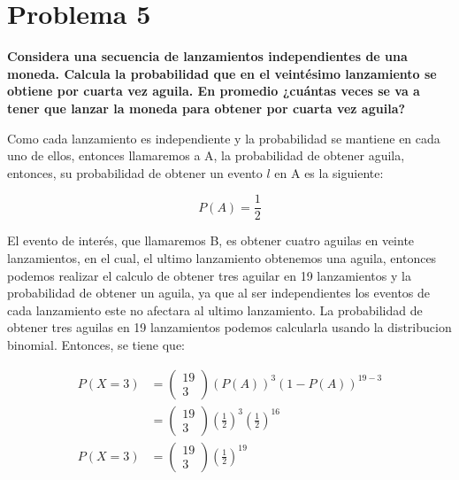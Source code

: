 \section*{Problema 5}
\textbf{Considera una secuencia de lanzamientos independientes de una moneda. Calcula la probabilidad que en el veintésimo lanzamiento se obtiene por cuarta vez aguila. En promedio ¿cuántas veces se va a tener que lanzar la moneda para obtener por cuarta vez aguila?}

Como cada lanzamiento es independiente y la probabilidad se mantiene en cada uno de ellos, entonces llamaremos a A, la probabilidad de obtener aguila, entonces, su probabilidad de obtener un evento $l$ en A es la siguiente:

\begin{equation*}
    P(A) = \frac{1}{2}
\end{equation*}

El evento de interés, que llamaremos B, es obtener cuatro aguilas en veinte lanzamientos, en el cual, el ultimo lanzamiento obtenemos una aguila, entonces podemos realizar el calculo de obtener tres aguilar en 19 lanzamientos y la probabilidad de obtener un aguila, ya que al ser independientes los eventos de cada lanzamiento este no afectara al ultimo lanzamiento. La probabilidad de obtener tres aguilas en 19 lanzamientos podemos calcularla usando la distribucion binomial. Entonces, se tiene que:

\begin{align*}
    P(X=3) & = \left(\begin{matrix}
        19 \\
        3
    \end{matrix}\right)(P(A))^3(1-P(A))^{19-3}                                 \\
           & = \left(\begin{matrix}
            19 \\
            3
        \end{matrix}\right)\left(\frac{1}{2}\right)^3\left(\frac{1}{2}\right)^{16} \\
    P(X=3) & = \left(\begin{matrix}
            19 \\
            3
        \end{matrix}\right)\left(\frac{1}{2}\right)^{19}
\end{align*}

